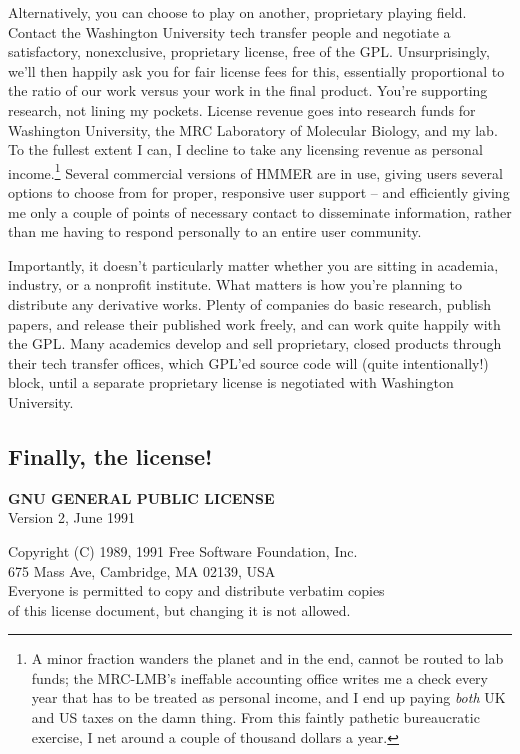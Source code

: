 Alternatively, you can choose to play on another, proprietary playing
field. Contact the Washington University tech transfer people and
negotiate a satisfactory, nonexclusive, proprietary license, free of
the GPL. Unsurprisingly, we'll then happily ask you for fair license
fees for this, essentially proportional to the ratio of our work
versus your work in the final product. You're supporting research, not
lining my pockets. License revenue goes into research funds for
Washington University, the MRC Laboratory of Molecular Biology, and my
lab. To the fullest extent I can, I decline to take any licensing
revenue as personal income.\footnote{A minor fraction wanders the
planet and in the end, cannot be routed to lab funds; the MRC-LMB's
ineffable accounting office writes me a check every year that has to
be treated as personal income, and I end up paying \emph{both} UK and
US taxes on the damn thing. From this faintly pathetic bureaucratic
exercise, I net around a couple of thousand dollars a year.} Several
commercial versions of HMMER are in use, giving users several options
to choose from for proper, responsive user support -- and efficiently
giving me only a couple of points of necessary contact to disseminate
information, rather than me having to respond personally to an entire
user community.

Importantly, it doesn't particularly matter whether you are sitting in
academia, industry, or a nonprofit institute. What matters is how
you're planning to distribute any derivative works. Plenty of
companies do basic research, publish papers, and release their
published work freely, and can work quite happily with the GPL. Many
academics develop and sell proprietary, closed products through their
tech transfer offices, which GPL'ed source code will (quite
intentionally!) block, until a separate proprietary license is
negotiated with Washington University. 

\subsection{Finally, the license!}

\begin{center}
{\bf GNU GENERAL PUBLIC LICENSE} \\
Version 2, June 1991
\end{center}

\begin{center}
Copyright (C) 1989, 1991 Free Software Foundation, Inc.\\
675 Mass Ave, Cambridge, MA 02139, USA\\
Everyone is permitted to copy and distribute verbatim copies\\
of this license document, but changing it is not allowed.\\
\end{center}

